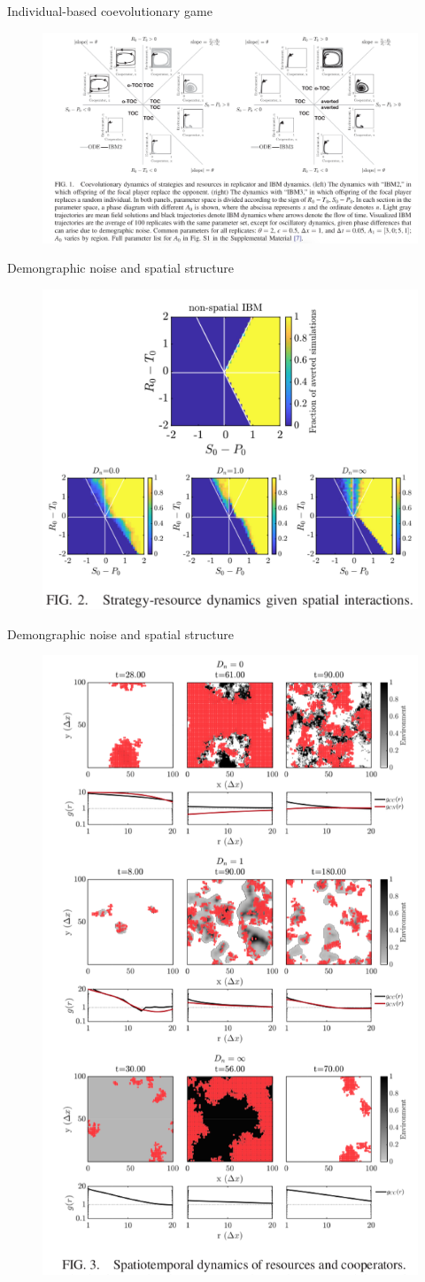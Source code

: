\documentclass{beamer}
\begin{document}
\begin{frame}{Individual-based coevolutionary game}
    \begin{figure}
        \centering
        \includegraphics[width = 0.9\linewidth]{Coevolutionary.png}
    \end{figure}
\end{frame}

\begin{frame}{Demongraphic noise and spatial structure}
    \begin{figure}
        \centering
        \includegraphics[width = 0.6\linewidth]{phase.png}
    \end{figure}
\end{frame}

\begin{frame}{Demongraphic noise and spatial structure}
    \begin{figure}
        \centering
        \includegraphics[height = 0.7\linewidth]{D_n.png}
    \end{figure}
\end{frame}
\end{document}
